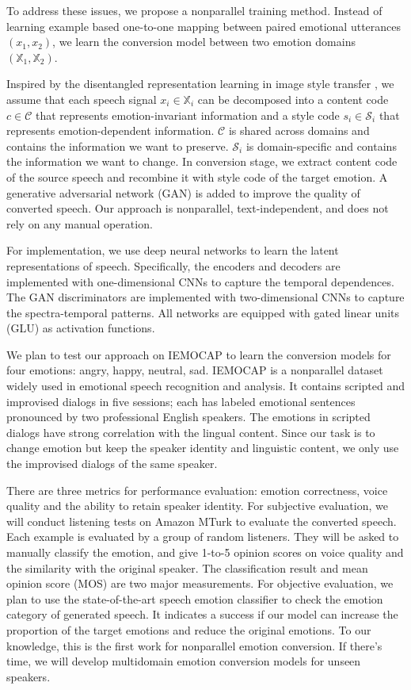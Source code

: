 \documentclass{article}
\begin{document}
To address these issues, we propose a nonparallel training method. Instead of learning example based one-to-one mapping between paired emotional utterances $(x_1, x_2)$, we learn the conversion model between two emotion domains $(\mathbb{X}_1, \mathbb{X}_2)$.

Inspired by the disentangled representation learning in image style transfer \cite{Huang_2018_ECCV,gatys2016image}, we assume that each speech signal $x_i \in \mathbb{X}_i$ can be decomposed into a content code $c \in \mathcal{C}$ that represents emotion-invariant information and a style code $s_i \in \mathcal{S}_i$ that represents emotion-dependent information. $\mathcal{C}$ is shared across domains and contains the information we want to preserve. $\mathcal{S}_i$ is domain-specific and contains the information we want to change. In conversion stage, we extract content code of the source speech and recombine it with style code of the target emotion. A generative adversarial network (GAN) \cite{NIPS2014_5423} is added to improve the quality of converted speech. Our approach is nonparallel, text-independent, and does not rely on any manual operation.

For implementation, we use deep neural networks to learn the latent representations of speech. Specifically, the encoders and decoders are implemented with one-dimensional CNNs to capture the temporal dependences. The GAN discriminators are implemented with two-dimensional CNNs to capture the spectra-temporal patterns. All networks are equipped with gated linear units (GLU) \cite{dauphin2017language} as activation functions.

We plan to test our approach on IEMOCAP \cite{busso2008iemocap} to learn the conversion models for four emotions: angry, happy, neutral, sad. IEMOCAP is a nonparallel dataset widely used in emotional speech recognition and analysis. It contains scripted and improvised dialogs in five sessions; each has labeled emotional sentences pronounced by two professional English speakers. The emotions in scripted dialogs have strong correlation with the lingual content. Since our task is to change emotion but keep the speaker identity and linguistic content, we only use the improvised dialogs of the same speaker.

There are three metrics for performance evaluation: emotion correctness, voice quality and the ability to retain speaker identity. For subjective evaluation, we will conduct listening tests on Amazon MTurk to evaluate the converted speech. Each example is evaluated by a group of random listeners. They will be asked to manually classify the emotion, and give 1-to-5 opinion scores on voice quality and the similarity with the original speaker. The classification result and mean opinion score (MOS) are two major measurements. For objective evaluation, we plan to use the state-of-the-art speech emotion classifier \cite{mirsamadi2017automatic} to check the emotion category of generated speech. It indicates a success if our model can increase the proportion of the target emotions and reduce the original emotions.  To our knowledge, this is the first work for nonparallel emotion conversion. If there's time, we will develop multidomain emotion conversion models for unseen speakers.
\end{document}
